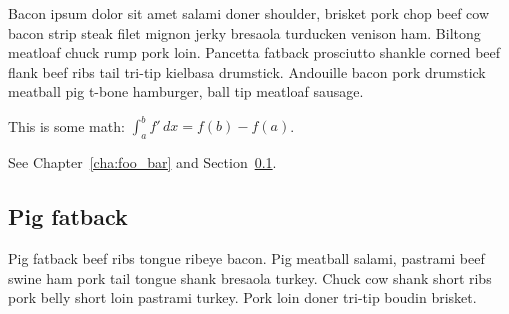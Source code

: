 Bacon ipsum dolor sit amet salami doner shoulder, brisket pork chop beef cow bacon strip steak filet mignon jerky bresaola turducken venison ham. Biltong meatloaf chuck rump pork loin. Pancetta fatback prosciutto shankle corned beef flank beef ribs tail tri-tip kielbasa drumstick. Andouille bacon pork drumstick meatball pig t-bone hamburger, ball tip meatloaf sausage.

This is some math: $\int_a^b f'\,dx = f(b) - f(a)$.

See Chapter~\ref{cha:foo_bar} and Section~\ref{sec:pig_fatback}.

\subsection{Pig fatback}
\label{sec:pig_fatback}

Pig fatback beef ribs tongue ribeye bacon. Pig meatball salami, pastrami beef swine ham pork tail tongue shank bresaola turkey. Chuck cow shank short ribs pork belly short loin pastrami turkey. Pork loin doner tri-tip boudin brisket.
